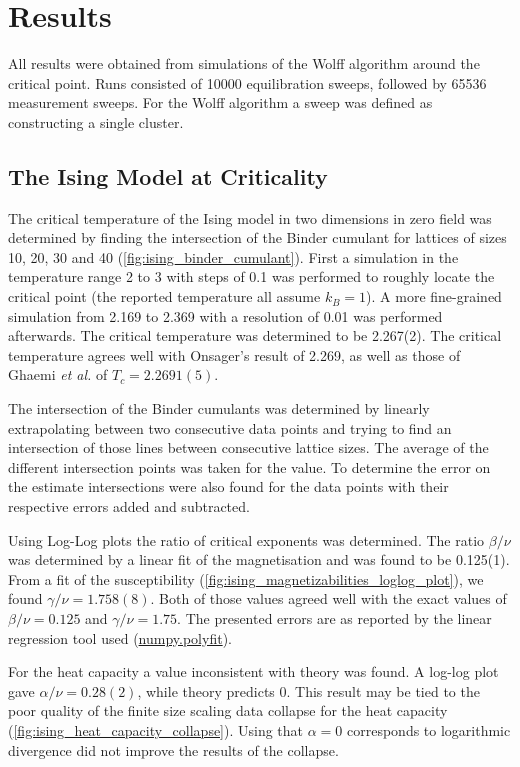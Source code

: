 \documentclass[11pt, a4paper]{report} %
\begin{document}
\chapter{Results}

All results were obtained from simulations of the Wolff algorithm around the critical point.
Runs consisted of 10000 equilibration sweeps, followed by 65536 measurement sweeps.
For the Wolff algorithm a sweep was defined as constructing a single cluster.

\section{The Ising Model at Criticality}

The critical temperature of the Ising model in two dimensions in zero field was determined by finding the intersection of the Binder cumulant for lattices of sizes 10, 20, 30 and 40 (\cref{fig:ising_binder_cumulant}).
First a simulation in the temperature range 2 to 3 with steps of 0.1 was performed to roughly locate the critical point (the reported temperature all assume \(k_B = 1\)).
A more fine-grained simulation from 2.169 to 2.369 with a resolution of 0.01 was performed afterwards.
The critical temperature was determined to be 2.267(2).
The critical temperature agrees well with Onsager's result of 2.269\cite{onsager:1944}, as well as those of Ghaemi \textit{et al.} of \(T_c = 2.2691(5)\)\cite{ghaemi:2001}.

The intersection of the Binder cumulants was determined by linearly extrapolating between two consecutive data points and trying to find an intersection of those lines between consecutive lattice sizes.
The average of the different intersection points was taken for the value.
To determine the error on the estimate intersections were also found for the data points with their respective errors added and subtracted.

Using Log-Log plots the ratio of critical exponents was determined.
The ratio \(\beta/\nu\) was determined by a linear fit of the magnetisation and was found to be 0.125(1).
From a fit of the susceptibility (\cref{fig:ising_magnetizabilities_loglog_plot}), we found \(\gamma/\nu = 1.758(8)\).
Both of those values agreed well with the exact values of \(\beta/\nu = 0.125\) and \(\gamma/\nu = 1.75\).
The presented errors are as reported by the linear regression tool used (\url{numpy.polyfit}).

For the heat capacity a value inconsistent with theory was found.
A log-log plot gave \(\alpha /\nu = 0.28(2)\), while theory predicts 0.
This result may be tied to the poor quality of the finite size scaling data collapse for the heat capacity (\cref{fig:ising_heat_capacity_collapse}).
Using that \(\alpha=0\) corresponds to logarithmic divergence did not improve the results of the collapse.
\end{document}
